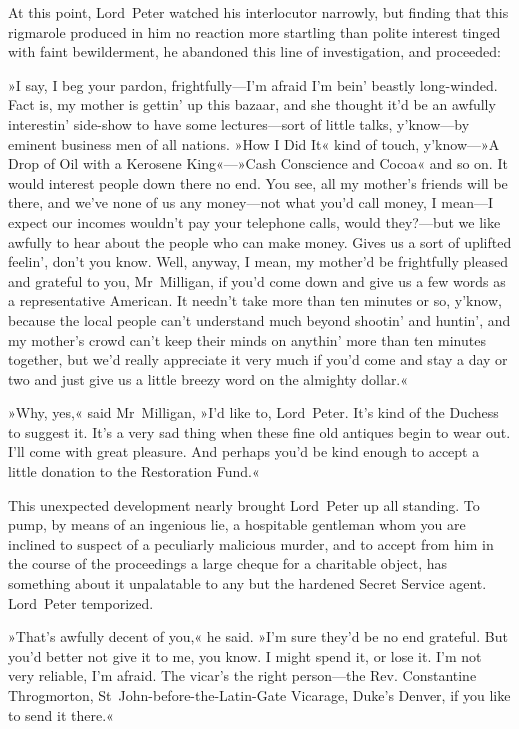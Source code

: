 At this point, Lord~Peter watched his interlocutor narrowly, but finding that this rigmarole produced in him no reaction more startling than polite interest tinged with faint bewilderment, he abandoned this line of investigation, and proceeded:

»I say, I beg your pardon, frightfully—I'm afraid I'm bein' beastly long-winded. Fact is, my mother is gettin' up this bazaar, and she thought it'd be an awfully interestin' side-show to have some lectures—sort of little talks, y'know—by eminent business men of all nations. »How I Did It« kind of touch, y'know---»A Drop of Oil with a Kerosene King«---»Cash Conscience and Cocoa« and so on. It would interest people down there no end. You see, all my mother's friends will be there, and we've none of us any money—not what you'd call money, I mean—I expect our incomes wouldn't pay your telephone calls, would they?---but we like awfully to hear about the people who can make money. Gives us a sort of uplifted feelin', don't you know. Well, anyway, I mean, my mother'd be frightfully pleased and grateful to you, Mr~Milligan, if you'd come down and give us a few words as a representative American. It needn't take more than ten minutes or so, y'know, because the local people can't understand much beyond shootin' and huntin', and my mother's crowd can't keep their minds on anythin' more than ten minutes together, but we'd really appreciate it very much if you'd come and stay a day or two and just give us a little breezy word on the almighty dollar.«

»Why, yes,« said Mr~Milligan, »I'd like to, Lord~Peter. It's kind of the Duchess to suggest it. It's a very sad thing when these fine old antiques begin to wear out. I'll come with great pleasure. And perhaps you'd be kind enough to accept a little donation to the Restoration Fund.«

This unexpected development nearly brought Lord~Peter up all standing. To pump, by means of an ingenious lie, a hospitable gentleman whom you are inclined to suspect of a peculiarly malicious murder, and to accept from him in the course of the proceedings a large cheque for a charitable object, has something about it unpalatable to any but the hardened Secret Service agent. Lord~Peter temporized.

»That's awfully decent of you,« he said. »I'm sure they'd be no end grateful. But you'd better not give it to me, you know. I might spend it, or lose it. I'm not very reliable, I'm afraid. The vicar's the right person—the Rev. Constantine Throgmorton, St~John-before-the-Latin-Gate Vicarage, Duke's Denver, if you like to send it there.«

